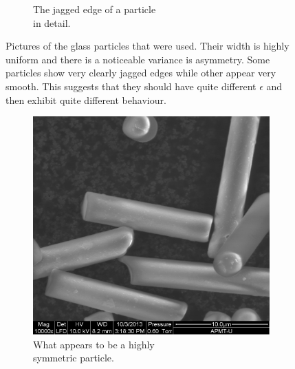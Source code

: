 \begin{figure}[H]
\begin{subfigure}[3b]{0.40\textwidth}
\caption{The jagged edge of a particle \\ in detail.}
\end{subfigure}
\caption{Pictures of the glass particles that were used. Their width is highly uniform and there is a noticeable variance is asymmetry. Some particles show very clearly jagged edges while other appear very smooth. This suggests that they should have quite different $\epsilon$ and then exhibit quite different behaviour.}
\label{fig:particlepictures}
\end{figure}
 
\begin{figure}[H]
\centering
\begin{subfigure}[3a]{0.40\textwidth}
\includegraphics[width=\textwidth]{figures/method/symmetric.png}
\caption{What appears to be a highly \\ symmetric particle.}\label{fig:symmetricparticle}
\end{subfigure}\hspace{1em}%
\begin{subfigure}[3b]{0.40\textwidth}

\end{subfigure}
\end{figure}
